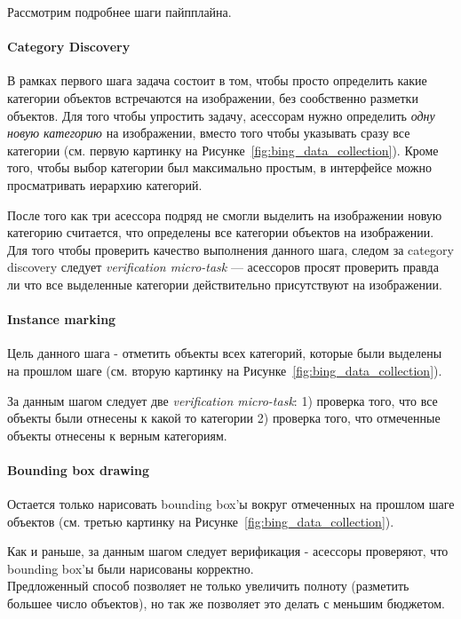 Рассмотрим подробнее шаги пайпплайна.

\paragraph{Category Discovery} В рамках первого шага задача состоит в том, чтобы просто определить какие категории объектов встречаются на изображении, без сообственно разметки объектов.
Для того чтобы упростить задачу, асессорам нужно определить \textit{одну новую категорию} на изображении, вместо того чтобы указывать сразу все категории (см. первую картинку на Рисунке~\ref{fig:bing_data_collection}).
Кроме того, чтобы выбор категории был максимально простым, в интерфейсе можно просматривать иерархию категорий.

После того как три асессора подряд не смогли выделить на изображении новую категорию считается, что определены все категории объектов на изображении. \\

Для того чтобы проверить качество выполнения данного шага, следом за category discovery следует \textit{verification micro-task} --- асессоров просят проверить правда ли что все выделенные категории действительно присутствуют на изображении.

\paragraph{Instance marking} Цель данного шага - отметить объекты всех категорий, которые были выделены на прошлом шаге (см. вторую картинку на Рисунке~\ref{fig:bing_data_collection}). 

За данным шагом следует две \textit{verification micro-task}: 1) проверка того, что все объекты были отнесены к какой то категории 2) проверка того, что отмеченные объекты отнесены к верным категориям.

\paragraph{Bounding box drawing} Остается только нарисовать bounding box'ы вокруг отмеченных на прошлом шаге объектов (см. третью картинку на Рисунке~\ref{fig:bing_data_collection}).

Как и раньше, за данным шагом следует верификация - асессоры проверяют, что bounding box'ы были нарисованы корректно. \\

Предложенный способ позволяет не только увеличить полноту (разметить большее число объектов), но так же позволяет это делать с меньшим бюджетом. \\

